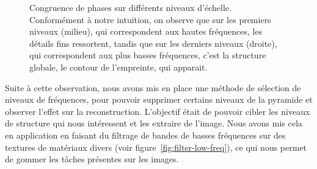 \begin{figure}
    \caption[Congruence de phases sur différents niveaux d'échelle]{Congruence de phases sur différents niveaux d'échelle. Conformément à notre intuition, on observe que sur les premiers niveaux (milieu), qui correspondent aux hautes fréquences, les détails fins ressortent, tandis que sur les derniers niveaux (droite), qui correspondent aux plus basses fréquences, c'est la structure globale, le contour de l'empreinte, qui apparait.}
    \label{fig:pc-selection-niveaux}
\end{figure}

Suite à cette observation, nous avons mis en place une méthode de sélection de niveaux de fréquences, pour pouvoir supprimer certains niveaux de la pyramide et observer l'effet sur la reconstruction. L'objectif était de pouvoir cibler les niveaux de structure qui nous intéressent et les extraire de l'image. Nous avons mis cela en application en faisant du filtrage de bandes de basses fréquences sur des textures de matériaux divers (voir figure~\ref{fig:filter-low-freq}), ce qui nous permet de \og gommer \fg{} les tâches présentes sur les images.

